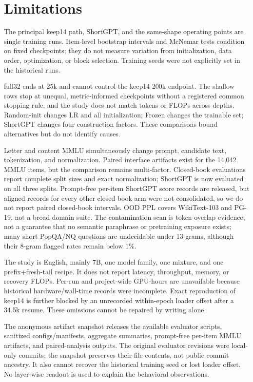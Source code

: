 \section*{Limitations}

The principal keep14 path, ShortGPT, and the same-shape operating points are
single training runs. Item-level bootstrap intervals and McNemar tests condition
on fixed checkpoints; they do not measure variation from initialization, data
order, optimization, or block selection. Training seeds were not explicitly
set in the historical runs.

full32 ends at 25k and cannot control the keep14 200k endpoint. The shallow
rows stop at unequal, metric-informed checkpoints without a registered common
stopping rule, and the study does not match tokens or FLOPs across depths.
Random-init changes LR and all initialization; Frozen changes the trainable
set; ShortGPT changes four construction factors. These comparisons bound
alternatives but do not identify causes.

Letter and content MMLU simultaneously change prompt, candidate text,
tokenization, and normalization. Paired interface artifacts exist for the
14,042 MMLU items, but the comparison remains multi-factor. Closed-book
evaluations report complete split sizes and exact normalization; ShortGPT is
now evaluated on all three splits. Prompt-free per-item ShortGPT score records
are released, but aligned records for every other closed-book arm were not
consolidated, so we do not report paired closed-book intervals. OOD PPL covers
WikiText-103 and PG-19, not a broad domain suite. The contamination scan is
token-overlap evidence, not a guarantee that no semantic paraphrase or
pretraining exposure exists; many short PopQA/NQ questions are undecidable
under 13-grams, although their 8-gram flagged rates remain below 1\%.

The study is English, mainly 7B, one model family, one mixture, and one
prefix+fresh-tail recipe. It does not report latency, throughput, memory, or
recovery FLOPs. Per-run and project-wide GPU-hours are unavailable because
historical hardware/wall-time records were incomplete. Exact reproduction of
keep14 is further blocked by an unrecorded within-epoch loader offset after a
34.5k resume. These omissions cannot be repaired by writing alone.

The anonymous artifact snapshot releases the available evaluator scripts,
sanitized configs/manifests, aggregate summaries, prompt-free per-item MMLU
artifacts, and paired-analysis outputs. The original evaluator revisions were
local-only commits; the snapshot preserves their file contents, not public
commit ancestry. It also cannot recover the historical training seed or lost
loader offset. No layer-wise readout is used to explain the behavioral
observations.
